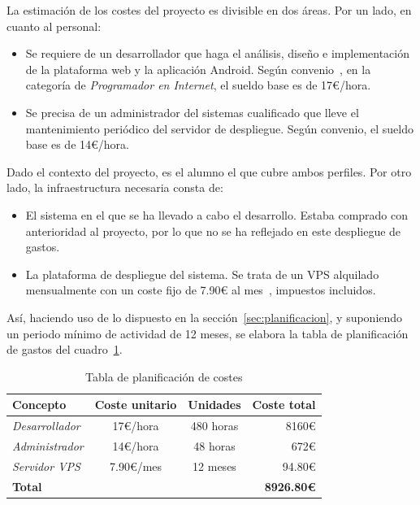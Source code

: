 La estimación de los costes del proyecto es divisible en dos áreas. Por un lado,
en cuanto al personal:

\begin{itemize}
\item Se requiere de un desarrollador que haga el análisis, diseño e
  implementación de la plataforma web y la aplicación Android. Según convenio~\cite{boe:convenio},
  en la categoría de \textit{Programador en Internet}, el sueldo base es de 17€/hora.
\item Se precisa de un administrador del sistemas cualificado que lleve el
  mantenimiento periódico del servidor de despliegue. Según convenio, el sueldo
  base es de 14€/hora.
\end{itemize}

Dado el contexto del proyecto, es el alumno el que cubre ambos perfiles. Por
otro lado, la infraestructura necesaria consta de:

\begin{itemize}
\item El sistema en el que se ha llevado a cabo el desarrollo. Estaba comprado
  con anterioridad al proyecto, por lo que no se ha reflejado en este despliegue
  de gastos.

\item La plataforma de despliegue del sistema. Se trata de un \ac{VPS} alquilado
  mensualmente con un coste fijo de 7.90€ al mes~\cite{hetznervq7}, impuestos
  incluidos.
\end{itemize}

Así, haciendo uso de lo dispuesto en la sección~\ref{sec:planificacion},
\textit{} y suponiendo un periodo mínimo de actividad
de 12 meses, se elabora la tabla de planificación de gastos del cuadro~\ref{tab:costes}.

\begin{table}[hbtp]
  \centering
  \begin{tabular}[h]{|l|c|c|r|}
    \hline
    \textbf{Concepto} & \textbf{Coste unitario} & \textbf{Unidades} & \textbf{Coste total} \\
    \hline
    \textit{Desarrollador} & 17€/hora & 480 horas & 8160€ \\
    \hline
    \textit{Administrador} & 14€/hora & 48 horas & 672€ \\
    \hline
    \textit{Servidor VPS} & 7.90€/mes & 12 meses & 94.80€ \\
    \hline
    \textbf{Total} & & & \textbf{8926.80€} \\
    \hline
  \end{tabular}
  \caption{Tabla de planificación de costes}
  \label{tab:costes}
\end{table}

